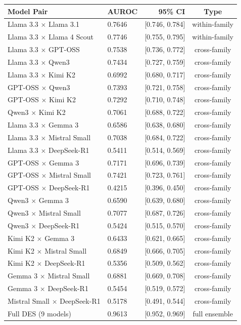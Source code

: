 \begin{tabular}{llrc}
\toprule
Model Pair & AUROC & 95\% CI & Type \\
\midrule
Llama 3.3 $\times$ Llama 3.1 & 0.7646 & [0.746, 0.784] & within-family \\
Llama 3.3 $\times$ Llama 4 Scout & 0.7746 & [0.755, 0.795] & within-family \\
Llama 3.3 $\times$ GPT-OSS & 0.7538 & [0.736, 0.772] & cross-family \\
Llama 3.3 $\times$ Qwen3 & 0.7434 & [0.727, 0.759] & cross-family \\
Llama 3.3 $\times$ Kimi K2 & 0.6992 & [0.680, 0.717] & cross-family \\
GPT-OSS $\times$ Qwen3 & 0.7393 & [0.721, 0.758] & cross-family \\
GPT-OSS $\times$ Kimi K2 & 0.7292 & [0.710, 0.748] & cross-family \\
Qwen3 $\times$ Kimi K2 & 0.7061 & [0.688, 0.722] & cross-family \\
Llama 3.3 $\times$ Gemma 3 & 0.6586 & [0.638, 0.680] & cross-family \\
Llama 3.3 $\times$ Mistral Small & 0.7038 & [0.684, 0.722] & cross-family \\
Llama 3.3 $\times$ DeepSeek-R1 & 0.5411 & [0.514, 0.569] & cross-family \\
GPT-OSS $\times$ Gemma 3 & 0.7171 & [0.696, 0.739] & cross-family \\
GPT-OSS $\times$ Mistral Small & 0.7421 & [0.723, 0.761] & cross-family \\
GPT-OSS $\times$ DeepSeek-R1 & 0.4215 & [0.396, 0.450] & cross-family \\
Qwen3 $\times$ Gemma 3 & 0.6590 & [0.639, 0.680] & cross-family \\
Qwen3 $\times$ Mistral Small & 0.7077 & [0.687, 0.726] & cross-family \\
Qwen3 $\times$ DeepSeek-R1 & 0.5424 & [0.515, 0.570] & cross-family \\
Kimi K2 $\times$ Gemma 3 & 0.6433 & [0.621, 0.665] & cross-family \\
Kimi K2 $\times$ Mistral Small & 0.6849 & [0.666, 0.705] & cross-family \\
Kimi K2 $\times$ DeepSeek-R1 & 0.5356 & [0.509, 0.562] & cross-family \\
Gemma 3 $\times$ Mistral Small & 0.6881 & [0.669, 0.708] & cross-family \\
Gemma 3 $\times$ DeepSeek-R1 & 0.5454 & [0.519, 0.572] & cross-family \\
Mistral Small $\times$ DeepSeek-R1 & 0.5178 & [0.491, 0.544] & cross-family \\
Full DES (9 models) & 0.9613 & [0.952, 0.969] & full ensemble \\
\bottomrule
\end{tabular}
